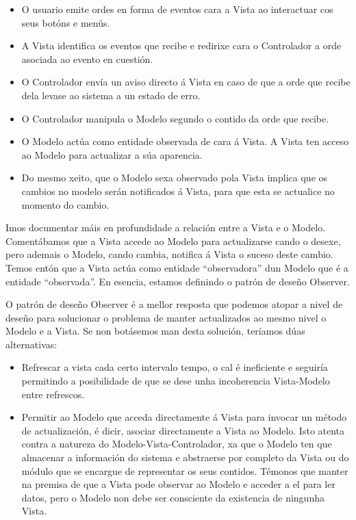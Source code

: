 \begin{itemize}
\item O usuario emite ordes en forma de eventos cara a Vista ao interactuar cos seus botóns e menús.
\item A Vista identifica os eventos que recibe e redirixe cara o Controlador a orde asociada ao evento en cuestión.
\item O Controlador envía un aviso directo á Vista en caso de que a orde que recibe dela levase ao sistema a un estado de erro.
\item O Controlador manipula o Modelo segundo o contido da orde que recibe.
\item O Modelo actúa como entidade observada de cara á Vista. A Vista ten acceso ao Modelo para actualizar a súa aparencia.
\item Do mesmo xeito, que o Modelo sexa observado pola Vista implica que os cambios no modelo serán notificados á Vista, para que esta se actualice no momento do cambio.
\end{itemize} 

Imos documentar máis en profundidade a relación entre a Vista e o Modelo. Comentábamos que a Vista accede ao Modelo para actualizarse cando o desexe, pero ademais o Modelo, cando cambia, notifica á Vista o suceso deste cambio. Temos entón que a Vista actúa como entidade ``observadora'' dun Modelo que é a entidade ``observada''. En esencia, estamos definindo o patrón de deseño Observer.

O patrón de deseño Observer é a mellor resposta que podemos atopar a nivel de deseño para solucionar o problema de manter actualizados ao mesmo nivel o Modelo e a Vista. Se non botásemos man desta solución, teríamos dúas alternativas:

\begin{itemize}
\item Refrescar a vista cada certo intervalo tempo, o cal é ineficiente e seguiría permitindo a posibilidade de que se dese unha incoherencia Vista-Modelo entre refrescos.
\item Permitir ao Modelo que acceda directamente á Vista para invocar un método de actualización, é dicir, asociar directamente a Vista ao Modelo. Isto atenta contra a natureza do Modelo-Vista-Controlador, xa que o Modelo ten que almacenar a información do sistema e abstraerse por completo da Vista ou do módulo que se encargue de representar os seus contidos. Témonos que manter na premisa de que a Vista pode observar ao Modelo e acceder a el para ler datos, pero o Modelo non debe ser consciente da existencia de ningunha Vista.
\end{itemize} 

